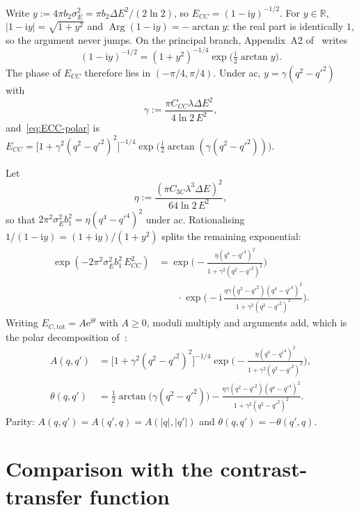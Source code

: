 \documentclass[11pt,a4paper]{article}
\theoremstyle{definition}
\theoremstyle{remark}
\DeclareMathOperator{\Arg}{Arg}
\newcommand{\R}{\mathbb{R}}
\newcommand{\ee}{\mathrm{e}}
\newcommand{\ii}{\mathrm{i}}
\newcommand{\abs}[1]{\lvert#1\rvert}
\newcommand{\sE}{\sigma_E}
\newcommand{\DE}{\Delta E}
\newcommand{\ECtot}{E_{C,\mathrm{tot}}}
\newcommand{\ECC}{E_{CC}}
\begin{document}
Write $y:=4\pi b_2\sE^2=\pi b_2\DE^2/(2\ln 2)$, so
$\ECC=(1-\ii y)^{-1/2}$.
For $y\in\R$, $\abs{1-\ii y}=\sqrt{1+y^2}$ and
$\Arg(1-\ii y)=-\arctan y$: the real part is identically $1$, so the
argument never jumps.
On the principal branch, Appendix~A2 of~\cite{Yu2019} writes
\begin{equation}
\label{eq:ECC-polar}
(1-\ii y)^{-1/2}
=(1+y^2)^{-1/4}
\exp\bigl(\tfrac{\ii}{2}\arctan y\bigr).
\end{equation}
The phase of $\ECC$ therefore lies in $(-\pi/4,\pi/4)$.
Under ac, $y=\gamma(q^2-{q'}^2)$ with
\begin{equation}
\label{eq:gamma}
\gamma:=\frac{\pi C_{CC}\lambda\DE^2}{4\ln 2\,E^2},
\end{equation}
and~\eqref{eq:ECC-polar} is
$\ECC
=\bigl[1+\gamma^2(q^2-{q'}^2)^2\bigr]^{-1/4}
\exp\bigl(\tfrac{\ii}{2}\arctan(\gamma(q^2-{q'}^2))\bigr)$.

Let
\begin{equation}
\label{eq:eta}
\eta:=\frac{(\pi C_{3C}\lambda^3\DE)^2}{64\ln 2\,E^2},
\end{equation}
so that $2\pi^2\sE^2 b_1^2=\eta(q^4-{q'}^4)^2$ under ac.
Rationalising $1/(1-\ii y)=(1+\ii y)/(1+y^2)$ splits the remaining
exponential:
\begin{equation}
\label{eq:exp-polar}
\begin{aligned}
\exp(-2\pi^2\sE^2 b_1^2\,\ECC^2)
&=\exp\Biggl(
-\frac{\eta(q^4-{q'}^4)^2}{1+\gamma^2(q^2-{q'}^2)^2}
\Biggr)\\
&\qquad\cdot
\exp\Biggl(
-\ii\,
\frac{\eta\gamma(q^2-{q'}^2)(q^4-{q'}^4)^2}{1+\gamma^2(q^2-{q'}^2)^2}
\Biggr).
\end{aligned}
\end{equation}
Writing $\ECtot=A\ee^{\ii\theta}$ with $A\ge 0$, moduli multiply and
arguments add, which is the polar decomposition of~\cite{Yu2019}:
\begin{equation}
\label{eq:A-theta}
\begin{aligned}
A(q,q')
&=\bigl[1+\gamma^2(q^2-{q'}^2)^2\bigr]^{-1/4}
\exp\Biggl(
-\frac{\eta(q^4-{q'}^4)^2}{1+\gamma^2(q^2-{q'}^2)^2}
\Biggr),\\
\theta(q,q')
&=\tfrac12\arctan\bigl(\gamma(q^2-{q'}^2)\bigr)
-\frac{\eta\gamma(q^2-{q'}^2)(q^4-{q'}^4)^2}{1+\gamma^2(q^2-{q'}^2)^2}.
\end{aligned}
\end{equation}
Parity: $A(q,q')=A(q',q)=A(\abs{q},\abs{q'})$ and
$\theta(q,q')=-\theta(q',q)$.

\section{Comparison with the contrast-transfer function}
\label{sec:ratios}
\end{document}
